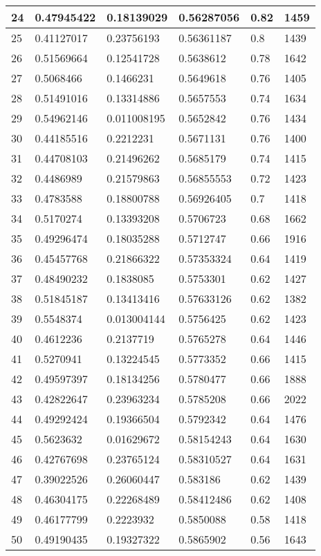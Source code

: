 \begin{longtable}{|l|l|l|l|l|l|}
24 & 0.47945422 & 0.18139029 & 0.56287056 & 0.82 & 1459 \\ \hline 
25 & 0.41127017 & 0.23756193 & 0.56361187 & 0.8 & 1439 \\ \hline 
26 & 0.51569664 & 0.12541728 & 0.5638612 & 0.78 & 1642 \\ \hline 
27 & 0.5068466 & 0.1466231 & 0.5649618 & 0.76 & 1405 \\ \hline 
28 & 0.51491016 & 0.13314886 & 0.5657553 & 0.74 & 1634 \\ \hline 
29 & 0.54962146 & 0.011008195 & 0.5652842 & 0.76 & 1434 \\ \hline 
30 & 0.44185516 & 0.2212231 & 0.5671131 & 0.76 & 1400 \\ \hline 
31 & 0.44708103 & 0.21496262 & 0.5685179 & 0.74 & 1415 \\ \hline 
32 & 0.4486989 & 0.21579863 & 0.56855553 & 0.72 & 1423 \\ \hline 
33 & 0.4783588 & 0.18800788 & 0.56926405 & 0.7 & 1418 \\ \hline 
34 & 0.5170274 & 0.13393208 & 0.5706723 & 0.68 & 1662 \\ \hline 
35 & 0.49296474 & 0.18035288 & 0.5712747 & 0.66 & 1916 \\ \hline 
36 & 0.45457768 & 0.21866322 & 0.57353324 & 0.64 & 1419 \\ \hline 
37 & 0.48490232 & 0.1838085 & 0.5753301 & 0.62 & 1427 \\ \hline 
38 & 0.51845187 & 0.13413416 & 0.57633126 & 0.62 & 1382 \\ \hline 
39 & 0.5548374 & 0.013004144 & 0.5756425 & 0.62 & 1423 \\ \hline 
40 & 0.4612236 & 0.2137719 & 0.5765278 & 0.64 & 1446 \\ \hline 
41 & 0.5270941 & 0.13224545 & 0.5773352 & 0.66 & 1415 \\ \hline 
42 & 0.49597397 & 0.18134256 & 0.5780477 & 0.66 & 1888 \\ \hline 
43 & 0.42822647 & 0.23963234 & 0.5785208 & 0.66 & 2022 \\ \hline 
44 & 0.49292424 & 0.19366504 & 0.5792342 & 0.64 & 1476 \\ \hline 
45 & 0.5623632 & 0.01629672 & 0.58154243 & 0.64 & 1630 \\ \hline 
46 & 0.42767698 & 0.23765124 & 0.58310527 & 0.64 & 1631 \\ \hline 
47 & 0.39022526 & 0.26060447 & 0.583186 & 0.62 & 1439 \\ \hline 
48 & 0.46304175 & 0.22268489 & 0.58412486 & 0.62 & 1408 \\ \hline 
49 & 0.46177799 & 0.2223932 & 0.5850088 & 0.58 & 1418 \\ \hline 
50 & 0.49190435 & 0.19327322 & 0.5865902 & 0.56 & 1643 \\ \hline 
\end{longtable}
